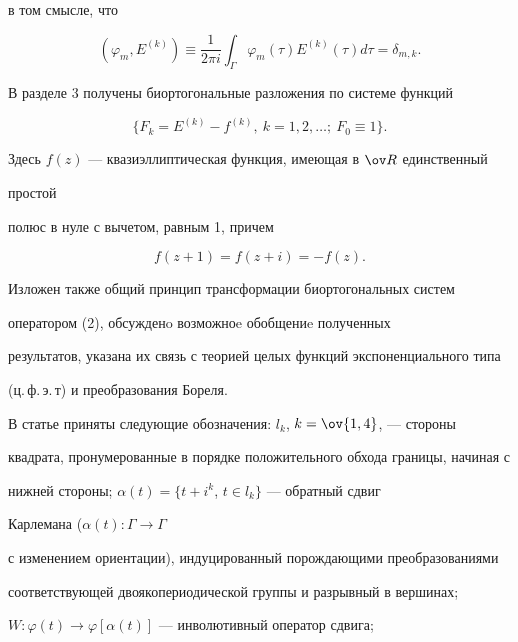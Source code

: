 в том смысле, что 


\begin{equation} 


(\varphi_m,E^{(k)})\equiv\frac{1}{2\pi i}\int_\Gamma 


\varphi_m(\tau)E^{(k)}(\tau)d\tau=\delta_{m,k}. 


\end{equation} 


В разделе 3 получены биортогональные разложения по системе функций 


\begin{equation} 


\{F_k=E^{(k)}-f^{(k)},\ k=1,2,\dotsc;\ F_0\equiv1\}. 


\end{equation} 


Здесь $f(z)$ --- квазиэллиптическая функция, имеющая в $\ov R$ единственный 


простой 


полюс в нуле с вычетом, равным 1, причем 


\begin{equation} 


f(z+1)=f(z+i)=-f(z). 


\end{equation} 


Изложен также общий принцип трансформации биортогональных систем 


оператором (2), обсужденo возможноe обобщениe полученных 


результатов, указана их связь с теорией целых функций экспоненциального типа 


(ц.\,ф.\,э.\,т) и преобразования Бореля. 


 


В статье приняты следующие обозначения: $l_k$, $k=\ov{1,4}$, --- стороны 


квадрата, пронумерованные в порядке положительного обхода границы, начиная с 


нижней стороны; $\alpha(t)=\{t+i^k$, $t\in l_k\}$ --- обратный сдвиг 


Карлемана ($\alpha(t):\Gamma\to\Gamma$ 


с изменением ориентации), индуцированный порождающими преобразованиями 


соответствующей двоякопериодической группы и разрывный в вершинах; 


$W:\varphi(t)\to\varphi[\alpha(t)]$ --- инволютивный оператор сдвига; 


